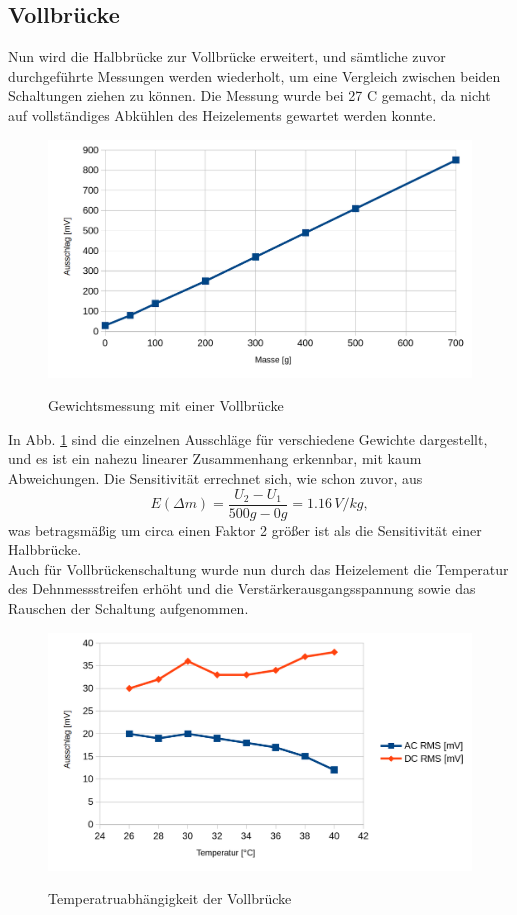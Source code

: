 \subsection{Vollbrücke}
Nun wird die Halbbrücke zur Vollbrücke erweitert, und sämtliche zuvor durchgeführte Messungen werden wiederholt, um eine Vergleich zwischen beiden Schaltungen ziehen zu können. Die Messung wurde bei 27 C gemacht, da nicht auf vollständiges Abkühlen des Heizelements gewartet werden konnte. 
\begin{figure}[H]
	\centering
	\includegraphics[width=\textwidth]{./img/ch3/GewichtsmessungVollbruecke_3_3_3.png}
	\label{fig:gewicht_vb}
	\caption{Gewichtsmessung mit einer Vollbrücke}
\end{figure}
In Abb. \ref{fig:gewicht_vb} sind die einzelnen Ausschläge für verschiedene Gewichte dargestellt, und es ist ein nahezu linearer Zusammenhang erkennbar, mit kaum Abweichungen. Die Sensitivität errechnet sich, wie schon zuvor, aus 
\begin{equation}
	E(\Delta m)=\frac{U_2-U_1}{500g-0g}=1.16\,V/kg,
\end{equation}
was betragsmäßig um circa einen Faktor 2 größer ist als die Sensitivität einer Halbbrücke. \\
Auch für Vollbrückenschaltung wurde nun durch das Heizelement die Temperatur des Dehnmessstreifen erhöht und die Verstärkerausgangsspannung sowie das Rauschen der Schaltung aufgenommen. 
\begin{figure}[H]
	\includegraphics[width=\textwidth]{./img/ch3/TemperaturmessungVollbruecke_3_3_3.png}
	\label{fig:temp_vb}
	\caption{Temperatruabhängigkeit der Vollbrücke}
\end{figure} \noindent
